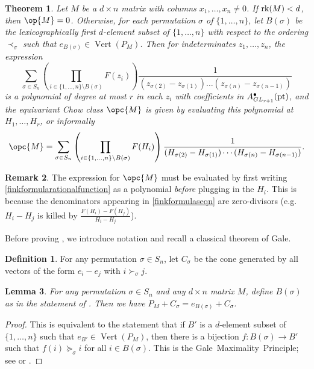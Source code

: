 \documentclass[12pt]{amsart}
\newcommand{\pt}{{\rm pt}}
\newcommand{\rk}{{\rm rk}}
\newcommand{\Vt}{{\operatorname{Vert}}}
\theoremstyle{plain}
\newtheorem{Thm}{Theorem}[section]
\newtheorem{Lem}[Thm]{Lemma}
\theoremstyle{definition}
\newtheorem{Def}{Definition}[section]
\newtheorem{Rem}[Thm]{Remark}
\theoremstyle{remark}
\begin{document}
\begin{Thm}\label{finkformulas}
Let $M$ be a $d \times n$ matrix with columns $x_1,\ldots, x_n \ne 0$. If $\rk(M) < d$, then $\op{M} = 0$. Otherwise, for each permutation $\sigma$ of $\{1,\ldots,n\}$, let $B(\sigma)$ be the lexicographically first $d$-element subset of $\{1,\ldots,n\}$ with respect to the ordering $\prec_\sigma$ such that $e_{B(\sigma)} \in \Vt(P_M)$. Then for indeterminates $z_1,\ldots,z_n$, the expression
\begin{equation}\label{finkformularationalfunction}
\sum_{\sigma \in S_n} \left(\prod_{i \in \{1,\ldots,n\}\setminus B(\sigma)} F(z_i)\right)\frac{1}{(z_{\sigma(2)}-z_{\sigma(1)})\ldots (z_{\sigma(n)}-z_{\sigma(n-1)})}
\end{equation} is a polynomial of degree at most $r$ in each $z_i$ with coefficients in $A^{\bullet}_{GL_{r+1}}(\pt)$, and the equivariant Chow class $\opc{M}$ is given by evaluating this polynomial at $H_1,\ldots,H_r$, or informally
\begin{equation}\label{finkformulaseqn}
\opc{M}=\sum_{\sigma \in S_n} \left(\prod_{i \in \{1,\ldots,n\}\setminus B(\sigma)} F(H_i)\right)\frac{1}{(H_{\sigma(2)}-H_{\sigma(1)})\cdots (H_{\sigma(n)}-H_{\sigma(n-1)})}.
\end{equation}
\end{Thm}
\begin{Rem}
The expression for $\opc{M}$ must be evaluated by first writing \eqref{finkformularationalfunction} as a polynomial \emph{before} plugging in the $H_i$. This is because the denominators appearing in \eqref{finkformulaseqn} are zero-divisors (e.g. $H_i-H_j$ is killed by $\frac{F(H_i)-F(H_j)}{H_i-H_j}$).
\end{Rem}

Before proving , we introduce notation and recall a classical theorem of Gale.

\begin{Def}
For any permutation $\sigma \in S_n$, let $C_\sigma$ be the cone generated by all vectors of the form $e_{i}-e_{j}$ with $i \succ_\sigma j$.
\end{Def}

\begin{Lem}\label{galemaximality}
For any permutation $\sigma \in S_n$ and any $d \times n$ matrix $M$, define $B(\sigma)$ as in the statement of . Then we have $P_M + C_\sigma = e_{B(\sigma)} + C_\sigma$.
\end{Lem}
\begin{proof}
This is equivalent to the statement that if $B'$ is a $d$-element subset of $\{1, \ldots, n\}$ such that $e_{B'} \in \Vt(P_M)$, then there is a bijection $f : B(\sigma) \to B'$ such that $f(i) \succeq_\sigma i$ for all $i \in B(\sigma)$. This is the Gale~Maximality~Principle; see \cite[Theorem 1.1]{Borovik} or \cite{Gale}.
\end{proof}
\end{document}

